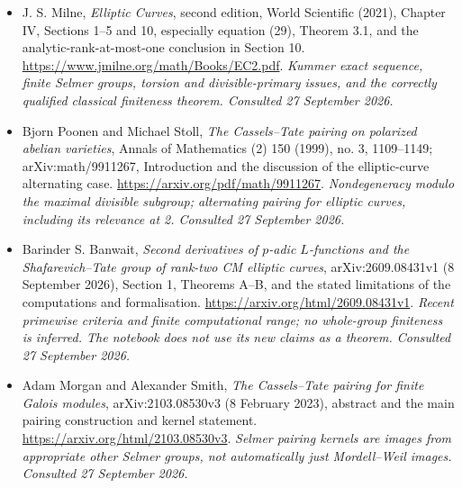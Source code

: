 \documentclass[11pt,a4paper]{article}
\numberwithin{equation}{section}
\begin{document}
\begin{itemize}
\item[\textnormal{[E1]}]\hypertarget{extra:30006701:1}{} J. S. Milne, \emph{Elliptic Curves}, second edition, World Scientific (2021), Chapter IV, Sections 1--5 and 10, especially equation (29), Theorem 3.1, and the analytic-rank-at-most-one conclusion in Section 10.
\url{https://www.jmilne.org/math/Books/EC2.pdf}.
{\small\textit{Kummer exact sequence, finite Selmer groups, torsion and divisible-primary issues, and the correctly qualified classical finiteness theorem. Consulted 27 September 2026.}}
\item[\textnormal{[E2]}]\hypertarget{extra:30006701:2}{} Bjorn Poonen and Michael Stoll, \emph{The Cassels--Tate pairing on polarized abelian varieties}, Annals of Mathematics (2) 150 (1999), no. 3, 1109--1149; arXiv:math/9911267, Introduction and the discussion of the elliptic-curve alternating case.
\url{https://arxiv.org/pdf/math/9911267}.
{\small\textit{Nondegeneracy modulo the maximal divisible subgroup; alternating pairing for elliptic curves, including its relevance at 2. Consulted 27 September 2026.}}
\item[\textnormal{[E3]}]\hypertarget{extra:30006701:3}{} Barinder S. Banwait, \emph{Second derivatives of $p$-adic $L$-functions and the Shafarevich--Tate group of rank-two CM elliptic curves}, arXiv:2609.08431v1 (8 September 2026), Section 1, Theorems A--B, and the stated limitations of the computations and formalisation.
\url{https://arxiv.org/html/2609.08431v1}.
{\small\textit{Recent primewise criteria and finite computational range; no whole-group finiteness is inferred. The notebook does not use its new claims as a theorem. Consulted 27 September 2026.}}
\item[\textnormal{[E4]}]\hypertarget{extra:30006701:4}{} Adam Morgan and Alexander Smith, \emph{The Cassels--Tate pairing for finite Galois modules}, arXiv:2103.08530v3 (8 February 2023), abstract and the main pairing construction and kernel statement.
\url{https://arxiv.org/html/2103.08530v3}.
{\small\textit{Selmer pairing kernels are images from appropriate other Selmer groups, not automatically just Mordell--Weil images. Consulted 27 September 2026.}}
\end{itemize}
\end{document}
